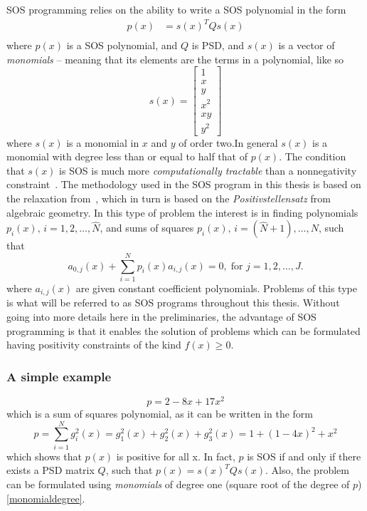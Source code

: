 \ac{SOS} programming relies on the ability to write a SOS polynomial in the form
\begin{align*}
  p(x) &= s{(x)}^{T}Qs(x)\\
\end{align*}
where \(p(x)\) is a \ac{SOS} polynomial, and \(Q\) is \ac{PSD}, and \(s(x)\) is
a vector of \textit{monomials} -- meaning that its elements are the terms in a
polynomial, like so
\[
  s(x) = \begin{bmatrix} 1 \\ x \\ y \\ x^2 \\ xy \\ y^2 \end{bmatrix}
\]
where \(s(x)\) is a monomial in \(x\) and \(y\) of order two.In general \(s(x)\)
is a monomial with degree less than or equal to half that of
\(p(x)\)\cite{parilloStructuredSemidefinitePrograms}\label{monomialdegree}. The
condition that \(s(x)\) is \ac{SOS} is much more \textit{computationally
  tractable} than a nonnegativity
constraint~\cite{parilloStructuredSemidefinitePrograms}. The methodology used in
the \ac{SOS} program in this thesis is based on the relaxation
from~\cite{parilloStructuredSemidefinitePrograms}, which in turn is based on the
\textit{Positivstellensatz} from algebraic geometry. In this type of problem the
interest is in finding polynomials \(p_i(x), \, i=1,2,\ldots,\hat{N}\), and sums
of squares \(p_i(x), \, i=(\hat{N}+1),\ldots,N\), such that
\[
  a_{0,j}(x) + \sum_{i=1}^{N}p_{i}(x)a_{i,j}(x) = 0, \; \text{for } j =
  1,2,\ldots,J.
\]
where \(a_{i,j}(x)\) are given constant coefficient polynomials. Problems of
this type is what will be referred to as \ac{SOS} programs throughout this
thesis\cite{sostools}. Without going into more details here in the
preliminaries, the advantage of \ac{SOS} programming is that it enables the
solution of problems which can be formulated having positivity constraints of
the kind \(f(x) \geq 0\).

\subsubsection{A simple example}

\[
  p = 2 - 8x + 17x^2
\]
which is a sum of squares polynomial, as it can be written in the form
\[
  p = \sum_{i=1}^{N}g_i^2(x) = g_1^2(x) + g_2^2(x) + g_3^2(x)= 1 + {(1-4x)}^2 +
  x^2
\]
which shows that \(p(x)\) is positive for all x. In fact, \(p\) is \ac{SOS} if
and only if there exists a \acl{PSD} matrix \(Q\), such that \(p(x) =
s{(x)}^{T}Qs(x)\). Also, the problem can be formulated using \textit{monomials} of
degree one (square root of the degree of \(p\))\ref{monomialdegree}.

